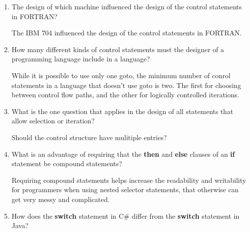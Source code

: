 \begin{enumerate}
  \item The design of which machine influenced the design
    of the control statements in FORTRAN?

  \begin{answer}

    The IBM 704 influenced the design of the control statements in FORTRAN.

    \end{answer}

  \item How many different kinds of control statements
    must the designer of a programming language include
    in a language?

  \begin{answer}

    While it is possible to use only one goto, the minimum number of conrol
statements in a language that doesn't use goto is two.  The first for choosing
between control flow paths, and the other for logically controlled iterations.

    \end{answer}

  \item What is the one question that applies in the
    design of all statements that allow selection or
    iteration?

 \begin{answer}

    Should the control structure have mulitiple entries?

    \end{answer}

  \item What is an advantage of requiring that
    the \textbf{then} and \textbf{else} clauses of
    an \textbf{if} statement be compound statements?

 \begin{answer}

    Requiring compound statements helps increase the readability and writability for
 programmers when using nested selector statements, that otherwise can get very
 messy and complicated.

    \end{answer}

  \item How does the \textbf{switch} statement in C\#
    differ from the \textbf{switch} statement in Java?

 \begin{answer}


\end{answer}
\end{enumerate}
